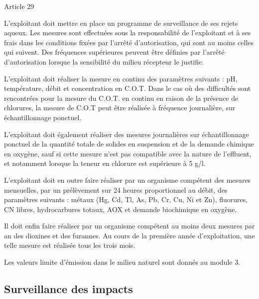 \vspace{0.3cm}

Article 29
\vspace{0.3cm}
\begin{tcolorbox}[colback=blue!5!white,colframe=blue!75!black]

L’exploitant doit mettre en place un programme de surveillance de ses rejets aqueux. Les mesures sont effectuées sous la responsabilité de l’exploitant et à ses frais dans les conditions fixées par l’arrêté d’autorisation, qui sont au moins celles qui suivent. Des fréquences supérieures peuvent être définies par l’arrêté d’autorisation lorsque la sensibilité du milieu récepteur le justifie.
 \vspace{0.3cm}

L’exploitant doit réaliser la mesure en continu des paramètres suivants : pH, température, débit et concentration en C.O.T. Dans le cas où des difficultés sont rencontrées pour la mesure du C.O.T. en continu en raison de la présence de chlorures, la mesure de C.O.T peut être réalisée à fréquence journalière, sur échantillonnage ponctuel.
 \vspace{0.3cm}

L’exploitant doit également réaliser des mesures journalières sur échantillonnage ponctuel de la quantité totale de solides en suspension et de la demande chimique en oxygène, sauf si cette mesure n’est pas compatible avec la nature de l’effluent, et notamment lorsque la teneur en chlorure est supérieure à 5 g/l.
 \vspace{0.3cm}

L’exploitant doit en outre faire réaliser par un organisme compétent des mesures mensuelles, par un prélèvement sur 24 heures proportionnel au débit, des paramètres suivants : métaux (Hg, Cd, Tl, As, Pb, Cr, Cu, Ni et Zn), fluorures, CN libres, hydrocarbures totaux, AOX et demande biochimique en oxygène.
\vspace{0.3cm}
 
Il doit enfin faire réaliser par un organisme compétent au moins deux mesures par an des dioxines et des furannes. Au cours de la première année d’exploitation, une telle mesure est réalisée tous les trois mois.

\end{tcolorbox}

Les valeurs limite d’émission dans le milieu naturel sont donnés au module 3.

\subsection{Surveillance des impacts}

